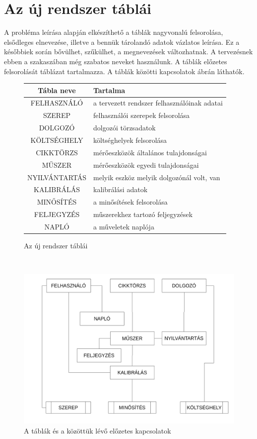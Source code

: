 \documentclass[a4paper,12pt]{report}
\begin{document}
\section{Az új rendszer táblái}
A probléma leírása alapján elkészíthető a táblák nagyvonalú felsorolása, 
elsődleges elnevezése, illetve a bennük tárolandó adatok vázlatos leírása. Ez a 
későbbiek során bővülhet, szűkülhet, a megnevezések változhatnak. A tervezésnek 
ebben a szakaszában még szabatos neveket használunk.
A táblák előzetes felsorolását  táblázat tartalmazza.
A táblák közötti kapcsolatok  ábrán láthatók.
\begin{figure}[ht!]
\centering
\begin{tabular}{|c|l|}
\hline
\textbf{Tábla neve}&\textbf{Tartalma}\\
\hline
FELHASZNÁLÓ & a tervezett rendszer felhasználóinak adatai\\
\hline
SZEREP & felhasználói szerepek felsorolása\\
\hline
DOLGOZÓ & dolgozói törzsadatok\\
\hline
KÖLTSÉGHELY & költséghelyek felsorolása\\
\hline
CIKKTÖRZS & mérőeszközök általános tulajdonságai\\
\hline
MŰSZER & mérőeszközök egyedi tulajdonságai\\
\hline
NYILVÁNTARTÁS & melyik eszköz melyik dolgozónál volt, van\\
\hline
KALIBRÁLÁS & kalibrálási adatok\\
\hline
MINŐSÍTÉS & a minősítések felsorolása\\
\hline
FELJEGYZÉS & műszerekhez tartozó feljegyzések\\
\hline
NAPLÓ & a műveletek naplója\\
\hline
\end{tabular}
\caption{Az új rendszer táblái}\label{tablak-0}
\end{figure}
\\

\begin{figure}[ht!]\label{tablak0-kapcs0}
\centering
\includegraphics[width=13cm]{kepek/tablak0-kapcs0.png}
\caption{A táblák és a közöttük lévő előzetes kapcsolatok}
\end{figure}
\end{document}
